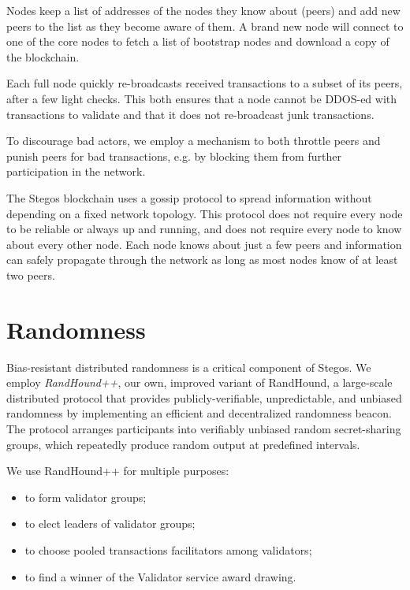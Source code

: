 \documentclass[8pt,fleqn,openany]{book}
\begin{document}
Nodes keep a list of addresses of the nodes they know about (peers) and add new peers to the list as they become aware of them. A brand new node will connect to one of the core nodes to fetch a list of bootstrap nodes and download a copy of the blockchain. 

Each full node quickly re-broadcasts received transactions to a subset of its peers, after a few  light checks. This both ensures that a node cannot be DDOS-ed with transactions to validate and that it does not re-broadcast junk transactions.

To discourage bad actors, we employ a mechanism to both throttle peers and punish peers for bad transactions, e.g. by blocking them from further participation in the network.

The Stegos blockchain uses a gossip protocol to spread information without depending on a fixed network topology. This protocol does not require every node to be reliable or always up and running, and does not require every node to know about every other node. Each node knows about just a few peers and information can safely propagate through the network as long as most nodes know of at least two peers.

\section{Randomness}

Bias-resistant distributed randomness is a critical component of Stegos. We employ \textit{RandHound++}, our own, improved variant of RandHound\cite{c12}, a large-scale distributed protocol that provides publicly-verifiable, unpredictable, and unbiased randomness by implementing an efficient and decentralized randomness beacon. The protocol arranges participants into verifiably unbiased random secret-sharing groups, which repeatedly produce random output at predefined intervals. 

We use RandHound++ for multiple purposes:

\begin{itemize}
  \item {to form validator groups;}
  \item {to elect leaders of validator groups;} 
  \item {to choose pooled transactions facilitators among validators;}
  \item {to find a winner of the Validator service award drawing.}
\end{itemize}
\end{document}
